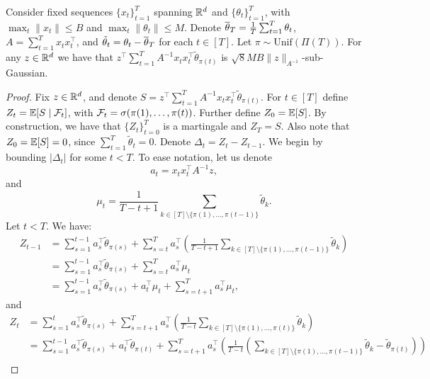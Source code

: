 \begin{lemma}\label{lem:sub-Gaussian1}
   Consider fixed sequences $\{x_t\}_{t=1}^T$ spanning $\mathbb{R}^d$ and $\{\theta_t\}_{t=1}^T$, with $\max_t\|x_t\| \leq B$ and $\max_t\|\theta_t\| \leq M$. Denote $\overline{\theta}_{T} = \frac{1}{T}\sum_{t=1}^T \theta_t$, $A = \sum_{t=1}^{T} x_{t}x_{t}^\top$, and $\tilde{\theta}_t = \theta_{t} - \overline{\theta}_{T}$ for each $t \in [T]$. Let $\pi \sim \mathrm{Unif}(\Pi(T))$. For any $z \in \mathbb{R}^d$ we have that $z^\top\sum_{t=1}^TA^{-1}x_tx_t^\top\tilde{\theta}_{\pi(t)}$ is $\sqrt{8}MB\|z\|_{A^{-1}}$-sub-Gaussian.
\end{lemma}
\begin{proof}
   Fix $z \in \mathbb{R}^d$, and denote $S = z^\top\sum_{t=1}^TA^{-1}x_tx_t^\top\tilde{\theta}_{\pi(t)} $. For $t \in [T]$ define $Z_t = \mathbb{E}[S \mid \mathcal{F}_t]$, with $\mathcal{F}_t = \sigma(\pi(1),\dots,\pi(t))$. Further define $Z_0 = \mathbb{E}[S]$. By construction, we have that $\{Z_t\}_{t=0}^T$ is a martingale and $Z_T = S$. Also note that $Z_0 = \mathbb{E}[S] = 0$, since $\sum_{t=1}^{T}\tilde{\theta}_t = 0$. Denote $\Delta_t = Z_t - Z_{t-1}$. We begin by bounding $|\Delta_t|$ for some $t< T$. To ease notation, let us denote \begin{equation}a_t = x_tx_t^\top A^{-1}z,\end{equation} and  \begin{equation}\mu_t = \frac{1}{T-t+1}\sum_{k \in [T] \setminus \{\pi(1),\dots,\pi(t-1)\}} \tilde{\theta}_k.\end{equation} Let $t < T$. We have:
   \begin{align*}
       Z_{t-1} &= \sum_{s=1}^{t - 1} a_s^\top\tilde{\theta}_{\pi(s)}   + \sum_{s = t }^T a_s^\top\left(\frac{1}{T - t+1}\sum_{k \in [T] \setminus \{\pi(1),\dots,\pi(t-1)\}} \tilde{\theta}_k\right) \\
       &= \sum_{s=1}^{t - 1} a_s^\top\tilde{\theta}_{\pi(s)}   + \sum_{s = t }^T a_s^\top\mu_t \\
       &= \sum_{s=1}^{t - 1} a_s^\top\tilde{\theta}_{\pi(s)}   + a_t^\top\mu_t + \sum_{s = t +1}^T a_s^\top\mu_t,
   \end{align*}
    and
    \begin{align*}
        Z_{t} &= \sum_{s=1}^{t} a_s^\top\tilde{\theta}_{\pi(s)}   + \sum_{s = t +1}^T a_s^\top\left(\frac{1}{T - t}\sum_{k \in [T] \setminus \{\pi(1),\dots,\pi(t)\}} \tilde{\theta}_k\right)\\
        &=\sum_{s=1}^{t - 1} a_s^\top\tilde{\theta}_{\pi(s)}  + a_t^\top\tilde{\theta}_{\pi(t)} + \sum_{s = t +1}^T a_s^\top\left(\frac{1}{T - t}\left(\sum_{k \in [T] \setminus \{\pi(1),\dots,\pi(t-1)\}} \tilde{\theta}_k - \tilde{\theta}_{\pi(t)}\right)\right) \\

\end{align*}
\end{proof}

